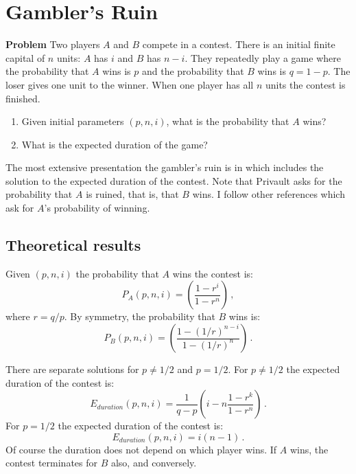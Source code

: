 
\section{Gambler's Ruin}\label{s.gamblers}

\textbf{Problem} Two players $A$ and $B$ compete in a contest. There is an initial finite capital of $n$ units: $A$ has $i$ and $B$ has $n-i$. They repeatedly play a game where the probability that $A$ wins is $p$ and the probability that $B$ wins is $q=1-p$. The loser gives one unit to the winner. When one player has all $n$ units the contest is finished.
\begin{enumerate}
\item Given initial parameters $(p, n, i)$, what is the probability that $A$ wins?
\item What is the expected duration of the game?
\end{enumerate}
\begin{center}
\end{center}
The most extensive presentation the gambler's ruin is in 
\cite[Chapter~2]{privault} which includes the solution to the expected duration of the contest. Note that Privault asks for the probability that $A$ is ruined, that is, that $B$ wins. I follow other references which ask for $A$'s probability of winning.

\subsection{Theoretical results}

Given $(p,n,i)$ the probability that $A$ wins the contest is:
\[
P_A(p, n, i) = \left(\frac{1-r^{i}}{1-r^n}\right)\,,
\]
where $r=q/p$. By symmetry, the probability that $B$ wins is:
\[
P_B(p, n, i) = \left(\frac{1-(1/r)^{n-i}}{1-(1/r)^{n}}\right)\,.
\]

There are separate solutions for $p\neq 1/2$ and $p=1/2$. For $p\neq 1/2$ the expected duration of the contest is:
\[
E_{\mathit{duration}}(p,n,i)=\frac{1}{q-p}\left(i-n
\frac{1-r^k}{1-r^n}\right)\,.
\]
For $p=1/2$ the expected duration of the contest is:
\[
E_{\mathit{duration}}(p,n,i)=i(n-1)\,.
\]
Of course the duration does not depend on which player wins. If $A$ wins, the contest terminates for $B$ also, and conversely.

